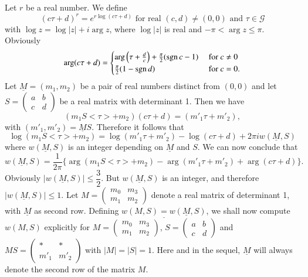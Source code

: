 Let \pageoriginale $r$ be a real number. We define
$$
(c\tau+d)^r = e^{r\log(c\tau+d)} \text{ for real } (c,d) \neq (0,0)
\text{ and } \tau \in \mathscr{G}
$$
with $\log z=\log |z|+i\arg z$, where $\log|z|$ is real and $-\pi
<\arg z\leq \pi$. Obviously
$$
\arg(c\tau+d) = 
\begin{cases}
\arg \left(\tau + \frac{d}{c}\right) + \frac{\pi}{2} (\operatorname{sgn} c-1) & \text{
  for } c \neq 0\\
\frac{\pi}{2} (1-\operatorname{sgn} d) & \text{ for } c=0.
\end{cases}
$$
Let $\underline{M}=(m_1, m_2)$ be a pair of real numbers distinct from
$(0,0)$ and let $S = \left(\begin{smallmatrix}
a&b\\c&d\end{smallmatrix} \right)$ be a real matrix with determinant
1. Then we have 
$$
(m_1S<\tau>+m_2) (c\tau+d) = (m'_1\tau+m'_2),
$$
with $(m'_1, m'_2)=\underline{M}S$. Therefore it follows that 
$$
\log (m_1 S <\tau>+m_2) =\log (m'_1\tau+m'_2) -\log(c\tau+d) + 2\pi i
w(\underline{M}, S)
$$ 
where $w(\underline{M},S)$ is an integer depending on $\underline{M}$
and $S$. We can now conclude that 
$$
w(\underline{M}, S) = \frac{1}{2\pi} \{\arg (m_1S<\tau>+m_2) -
\arg(m'_1\tau+ m'_2) + \arg (c\tau +d)\}.
$$
Obviously $|w(\underline{M},S)|\leq \dfrac{3}{2}$. But
$w(\underline{M}, S)$ is an integer, and therefore $|w(\underline{M},
S)|\leq 1$. Let $M=\left(\begin{smallmatrix}m_0
  &m_3\\m_1&m_2 \end{smallmatrix} \right)$ denote a real matrix of
determinant 1, with $\underline{M}$ as second row. Defining
$\underline{w(M,S)=w(\underline{M},S)}$, we shall now compute $w(M,S)$
explicitly for $M = \left(\begin{smallmatrix}
m_0 & m_3 \\ m_1 & m_2
\end{smallmatrix} \right)$, $S = \left(\begin{smallmatrix}
a&b\\c&d\end{smallmatrix} \right)$ and $MS=\left(\begin{smallmatrix}
\ast & \ast\\ m'_1 & m'_2\end{smallmatrix} \right)$ with
$|M|=|S|=1$. Here and in the sequel, $\underline{M}$ will always
denote the second row \pageoriginale of the matrix $M$.
